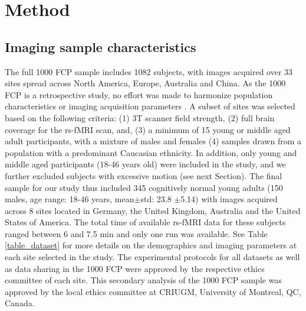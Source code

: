 \documentclass[authoryear]{elsarticle}
\begin{document}
\section{Method}

\subsection{Imaging sample characteristics}
The full 1000 FCP sample includes 1082 subjects, with images acquired over 33 sites spread across North America, Europe, Australia and China. As the 1000 FCP is a retrospective study, no effort was made to harmonize population characteristics or imaging acquisition parameters \citep{Biswal2010}. A subset of sites was selected based on the following criteria: (1) 3T scanner field strength, (2) full brain coverage for the rs-fMRI scan, and, (3) a minimum of 15 young or middle aged adult participants, with a mixture of males and females (4) samples drawn from a population with a predominant Caucasian ethnicity. In addition, only young and middle aged participants (18-46 years old) were included in the study, and we further excluded subjects with excessive motion (see next Section). The final sample for our study thus included 345 cognitively normal young adults (150 males, age range: 18-46 years, mean$\pm$std: 23.8 $\pm$5.14) with images acquired across 8 sites located in Germany, the United Kingdom, Australia and the United States of America. The total time of available rs-fMRI data for these subjects ranged between 6 and 7.5 min and only one run was available. See Table \ref{table_dataset} for more details on the demographics and imaging parameters at each site selected in the study.  The experimental protocols for all datasets as well as data sharing in the 1000 FCP were approved by the respective ethics committee of each site. This secondary analysis of the 1000 FCP sample was approved by the local ethics committee at CRIUGM, University of Montreal, QC, Canada.
\end{document}
